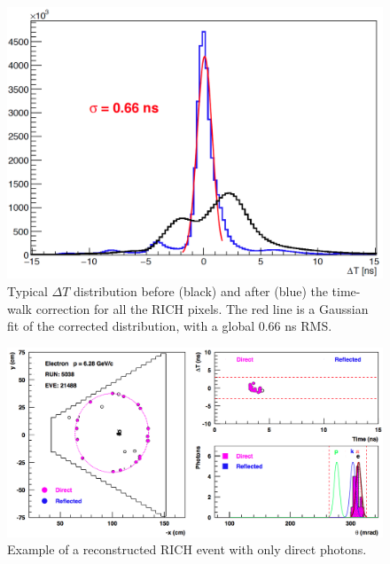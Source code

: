 \documentclass[5p,times,twocolumn]{elsarticle}
\def\dT{$\Delta T$ }
\begin{document}
\begin{figure}[h]
\begin{center}
\includegraphics[width=0.9\columnwidth]{Calibration_allch.png}
\end{center}
\caption{Typical \dT distribution before (black) and after (blue) the time-walk correction for all the RICH pixels.
The red line is a Gaussian fit of the corrected distribution, with a global 0.66 ns RMS.}
\label{Fig:ResoTime}
\end{figure}


\onecolumn
\begin{figure}[t]
\begin{center}
\includegraphics[width=0.9\columnwidth]{Event_21488.png}
\end{center}
\caption{Example of a reconstructed RICH event with only direct photons.} 
\label{Fig:Event1}
\end{figure}
\end{document}
